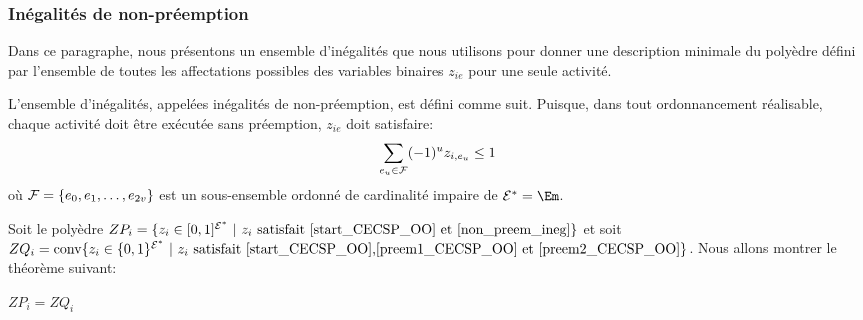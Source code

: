 \subsubsection{Inégalités de non-préemption}

Dans ce paragraphe, nous présentons un ensemble d'inégalités que nous
utilisons pour donner une description minimale du polyèdre défini par
l'ensemble de toutes les affectations possibles des variables binaires
$z_{ie}$ pour une seule activité. 

L'ensemble d'inégalités, appelées inégalités de non-préemption, est
défini comme suit. Puisque, dans tout ordonnancement réalisable,
chaque activité doit être exécutée sans préemption, $z_{ie}$ doit
satisfaire:
\begin{equation}
  \sum_{e_u \in {\cal F}} (-1)^{u} z_{i,e_u} \le 1
\label{non_preem_ineg}
\end{equation}
où ${\cal F}=\{e_0,e_1,\dots,e_{2v}\}$ est un sous-ensemble ordonné de
cardinalité impaire de $\E^*=\Em$.  

Soit le polyèdre $ZP_i=\{z_i \in [0,1]^{{\cal E}^*}\ | \ z_i\text{ satisfait
\eqref{start_CECSP_OO} et \eqref{non_preem_ineg}}\}$ et soit
$ZQ_i=\mathrm{conv}\{z_i \in \{0,1\}^{{\cal E}^*}\ | \ z_i\text{ satisfait
\eqref{start_CECSP_OO},\eqref{preem1_CECSP_OO} et
\eqref{preem2_CECSP_OO}}\}$. Nous allons montrer le théorème suivant: 

\begin{theo}
$ZP_i=ZQ_i$
\end{theo}

